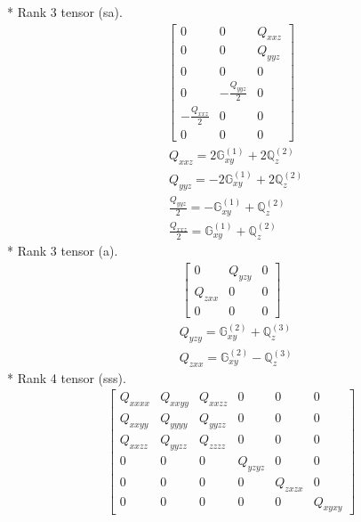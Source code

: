 \documentclass[fleqn,8pt,landscape]{jsarticle}
\begin{document}
* Rank 3 tensor (sa).
\begin{align*}
\begin{bmatrix} 0 & 0 & Q_{xxz} \\ 0 & 0 & Q_{yyz} \\ 0 & 0 & 0 \\ 0 & - \frac{Q_{yyz}}{2} & 0 \\ - \frac{Q_{xxz}}{2} & 0 & 0 \\ 0 & 0 & 0 \end{bmatrix}
\end{align*}
\begin{align*}
& Q_{xxz} = 2 \mathbb{G}_{xy}^{(1)} + 2 \mathbb{Q}_{z}^{(2)} \\
& Q_{yyz} = - 2 \mathbb{G}_{xy}^{(1)} + 2 \mathbb{Q}_{z}^{(2)} \\
& \frac{Q_{yyz}}{2} = - \mathbb{G}_{xy}^{(1)} + \mathbb{Q}_{z}^{(2)} \\
& \frac{Q_{xxz}}{2} = \mathbb{G}_{xy}^{(1)} + \mathbb{Q}_{z}^{(2)}
\end{align*}
* Rank 3 tensor (a).
\begin{align*}
\begin{bmatrix} 0 & Q_{yzy} & 0 \\ Q_{zxx} & 0 & 0 \\ 0 & 0 & 0 \end{bmatrix}
\end{align*}
\begin{align*}
& Q_{yzy} = \mathbb{G}_{xy}^{(2)} + \mathbb{Q}_{z}^{(3)} \\
& Q_{zxx} = \mathbb{G}_{xy}^{(2)} - \mathbb{Q}_{z}^{(3)}
\end{align*}
* Rank 4 tensor (sss).
\begin{align*}
\begin{bmatrix} Q_{xxxx} & Q_{xxyy} & Q_{xxzz} & 0 & 0 & 0 \\ Q_{xxyy} & Q_{yyyy} & Q_{yyzz} & 0 & 0 & 0 \\ Q_{xxzz} & Q_{yyzz} & Q_{zzzz} & 0 & 0 & 0 \\ 0 & 0 & 0 & Q_{yzyz} & 0 & 0 \\ 0 & 0 & 0 & 0 & Q_{zxzx} & 0 \\ 0 & 0 & 0 & 0 & 0 & Q_{xyxy} \end{bmatrix}
\end{align*}
\end{document}
